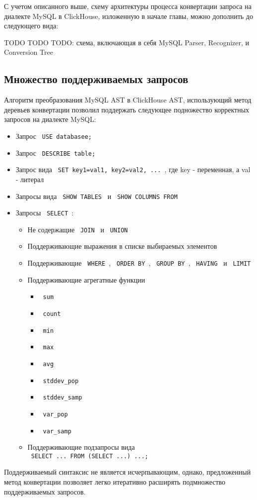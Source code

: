 С учетом описанного выше, схему архитектуры процесса конвертации запроса на диалекте MySQL в ClickHouse, изложенную в начале главы, можно дополнить до следующего вида:

TODO TODO TODO: схема, включающая в себя MySQL Parser, Recognizer, и Conversion Tree

\subsection{Множество поддерживаемых запросов} \label{part:queries}
Алгоритм преобразования MySQL AST в ClickHouse AST, использующий метод деревьев конвертации позволил поддержать следующее подножество корректных запросов на диалекте MySQL:
\begin{itemize}
    \item Запрос \texttt{ USE databasee; }
    \item Запрос \texttt{ DESCRIBE table; }
    \item Запрос вида \texttt{ SET key1=val1, key2=val2, ... }, где key - переменная, а val - литерал
    \item Запросы вида \texttt{ SHOW TABLES } и \texttt{ SHOW COLUMNS FROM }
    \item Запросы \texttt{ SELECT }:
    \begin{itemize}
        \item Не содержащие \texttt{ JOIN } и \texttt{ UNION }
        \item Поддерживающие выражения в списке выбираемых элементов
        \item Поддерживающие \texttt{ WHERE }, \texttt{ ORDER BY }, \texttt{ GROUP BY }, \texttt{ HAVING } и \texttt{ LIMIT }
        \item Поддерживающие агрегатные функции 
        \begin{itemize}
            \item \texttt{ sum }
            \item \texttt{ count }
            \item \texttt{ min }
            \item \texttt{ max }
            \item \texttt{ avg }
            \item \texttt{ stddev_pop}
            \item \texttt{ stddev_samp }
            \item \texttt{ var_pop }
            \item \texttt{ var_samp }
        \end{itemize}
        \item Поддерживающие подзапросы вида \\ \texttt{ SELECT ... FROM (SELECT ...) ...; }
    \end{itemize}
\end{itemize}

Поддерживаемый синтаксис не является исчерпывающим, однако, предложенный метод конвертации позволяет легко итеративно расширять подмножество поддерживаемых запросов.

\pagebreak
